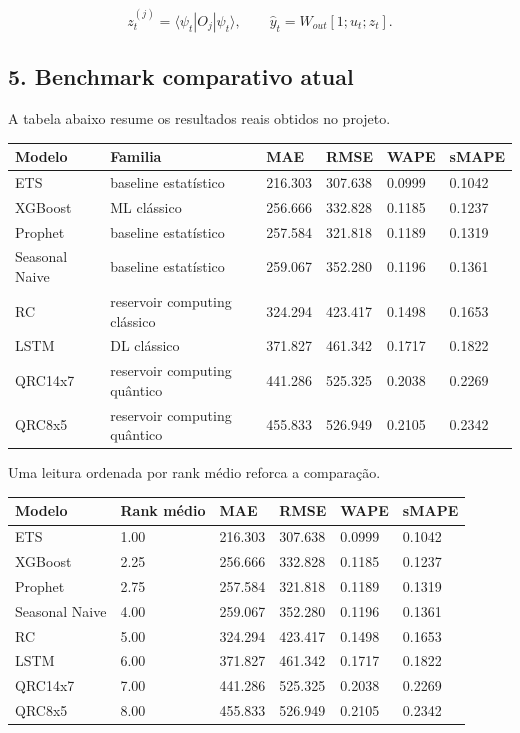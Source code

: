 \documentclass[12pt]{article}
\begin{document}
\[
z_t^{(j)} = \langle \psi_t | O_j | \psi_t \rangle,
\qquad
\hat{y}_t = W_{out} [1; u_t; z_t].
\]

\subsection{5. Benchmark comparativo atual}\label{5-benchmark-comparativo-atual}

A tabela abaixo resume os resultados reais obtidos no projeto.

\begin{longtable}[]{@{}llllll@{}}
\toprule\noalign{}
Modelo & Familia & MAE & RMSE & WAPE & sMAPE \\
\midrule\noalign{}
\endhead
\bottomrule\noalign{}
\endlastfoot
ETS & baseline estatístico & 216.303 & 307.638 & 0.0999 & 0.1042 \\
XGBoost & ML clássico & 256.666 & 332.828 & 0.1185 & 0.1237 \\
Prophet & baseline estatístico & 257.584 & 321.818 & 0.1189 & 0.1319 \\
Seasonal Naive & baseline estatístico & 259.067 & 352.280 & 0.1196 & 0.1361 \\
RC & reservoir computing clássico & 324.294 & 423.417 & 0.1498 & 0.1653 \\
LSTM & DL clássico & 371.827 & 461.342 & 0.1717 & 0.1822 \\
QRC14x7 & reservoir computing quântico & 441.286 & 525.325 & 0.2038 & 0.2269 \\
QRC8x5 & reservoir computing quântico & 455.833 & 526.949 & 0.2105 & 0.2342 \\
\end{longtable}

Uma leitura ordenada por rank médio reforca a comparação.

\begin{longtable}[]{@{}llllll@{}}
\toprule\noalign{}
Modelo & Rank médio & MAE & RMSE & WAPE & sMAPE \\
\midrule\noalign{}
\endhead
\bottomrule\noalign{}
\endlastfoot
ETS & 1.00 & 216.303 & 307.638 & 0.0999 & 0.1042 \\
XGBoost & 2.25 & 256.666 & 332.828 & 0.1185 & 0.1237 \\
Prophet & 2.75 & 257.584 & 321.818 & 0.1189 & 0.1319 \\
Seasonal Naive & 4.00 & 259.067 & 352.280 & 0.1196 & 0.1361 \\
RC & 5.00 & 324.294 & 423.417 & 0.1498 & 0.1653 \\
LSTM & 6.00 & 371.827 & 461.342 & 0.1717 & 0.1822 \\
QRC14x7 & 7.00 & 441.286 & 525.325 & 0.2038 & 0.2269 \\
QRC8x5 & 8.00 & 455.833 & 526.949 & 0.2105 & 0.2342 \\
\end{longtable}
\end{document}
